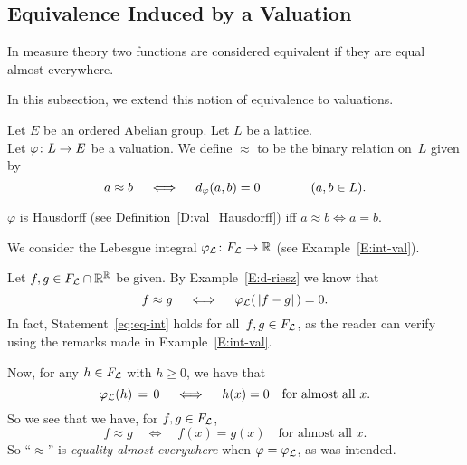 \documentclass[main.tex]{subfiles}
\begin{document}
\subsection{Equivalence Induced by a Valuation}
\label{SS:vals_eq}
In measure theory
two functions are considered equivalent
if they are equal almost everywhere.

In this subsection, we extend this notion of equivalence 
to valuations. 
%
%
\begin{dfn}
\label{D:eq}
Let $E$ be an ordered Abelian group.
Let $L$ be a lattice.\\
Let $\varphi\colon L\rightarrow E$ be a valuation.
We define $\approx$ to be 
the binary relation on~$L$ given by
\begin{equation*}
a \approx b
\quad\iff\quad
d_{\smash{\varphi}}(a,b)=0\qquad\qquad(a,b\in L).
\end{equation*}
\end{dfn}
\begin{rem}
$\varphi$ is Hausdorff (see Definition~\ref{D:val_Hausdorff})
iff $a \approx b\iff a = b$.
\end{rem}
%
%
\begin{ex}
\label{E:eq-int}
We consider the Lebesgue integral $\varphi_{\mathcal{L}}\colon F_{\mathcal{L}}\rightarrow \mathbb{R}$
(see Example~\ref{E:int-val}).

Let $f,g\in F_{\mathcal{L}}\cap \mathbb{R}^{\mathbb{R}}$ be given.
By Example~\ref{E:d-riesz} 
we know that
\begin{equation}
\label{eq:eq-int}
f\approx g\quad\iff\quad \varphi_{\mathcal{L}}(\,|f-g|\,)=0.
\end{equation}
In fact,
Statement~\eqref{eq:eq-int}
holds for all~$f,g\in F_{\mathcal{L}}$,
as the reader can verify using the remarks
made in Example~\ref{E:int-val}.

Now, for any $h\in F_{\mathcal{L}}$
with $h\geq 0$,
we have that
\begin{equation*}
\varphi_{\mathcal{L}}(h)\,=\,0
\quad\iff\quad \text{$h(x)=0$\quad for almost all~$x$.}
\end{equation*}
So we see that
we have, for $f,g\in F_{\mathcal{L}}$,
\begin{equation*}
f\approx g\quad\iff\quad f(x) = g(x)\quad\text{for almost all~$x$}.
\end{equation*}
So ``$\approx$''
is \emph{equality almost everywhere}
when $\varphi=\varphi_{\mathcal{L}}$,
as was intended.
\end{ex}
%
%
\end{document}
